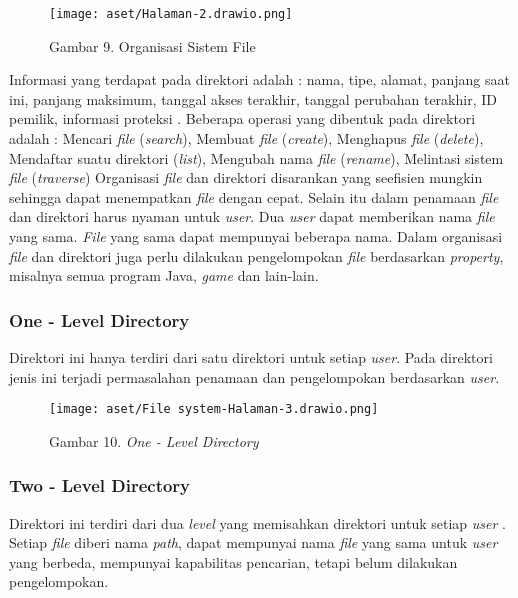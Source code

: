 \documentclass[12pt]{article}
\begin{document}
\begin{itemize}
		\begin{figure}[h!]
			\centering
			\texttt{[image: aset/Halaman-2.drawio.png]}
			\captionsetup{labelformat=empty}
			\caption{Gambar 9. Organisasi Sistem File}
		\end{figure}
		
		Informasi yang terdapat pada direktori adalah :  nama, tipe, alamat, panjang saat ini,  panjang maksimum, tanggal akses terakhir, tanggal perubahan terakhir, ID pemilik, informasi proteksi . Beberapa operasi yang dibentuk pada direktori adalah : Mencari \textit{file} (\textit{search}),  Membuat \textit{file} (\textit{create}), Menghapus \textit{file} (\textit{delete}), Mendaftar suatu direktori (\textit{list}), Mengubah nama \textit{file} (\textit{r\textit{ename}}),  Melintasi sistem \textit{file }(\textit{traverse})   
		Organisasi \textit{file} dan direktori disarankan yang seefisien mungkin sehingga dapat menempatkan \textit{file} dengan cepat. Selain itu dalam penamaan \textit{file} dan direktori harus nyaman untuk\textit{ user}. Dua \textit{user} dapat memberikan nama \textit{file} yang sama. \textit{File} yang sama dapat mempunyai beberapa nama. Dalam organisasi \textit{file} dan direktori juga perlu dilakukan pengelompokan \textit{file }berdasarkan \textit{property}, misalnya semua program Java, \textit{game} dan lain-lain. 
		
		\subsubsection{One - Level Directory}
		Direktori ini hanya terdiri dari satu direktori untuk setiap\textit{ user}. Pada direktori jenis ini terjadi permasalahan penamaan dan pengelompokan berdasarkan \textit{user.} 
		\begin{figure}[h!]
			\centering
			\texttt{[image: aset/File system-Halaman-3.drawio.png]}
			\captionsetup{labelformat=empty}
			\caption{Gambar 10.\textit{ One - Level Directory}}
		\end{figure}
		
		\subsubsection{Two - Level Directory}
		Direktori ini terdiri dari dua \textit{level} yang memisahkan direktori untuk setiap \textit{user} . Setiap \textit{file} diberi nama \textit{path}, dapat mempunyai nama \textit{file} yang sama untuk \textit{user} yang berbeda, mempunyai kapabilitas pencarian, tetapi belum dilakukan pengelompokan. 
		

\end{itemize}
\end{document}
